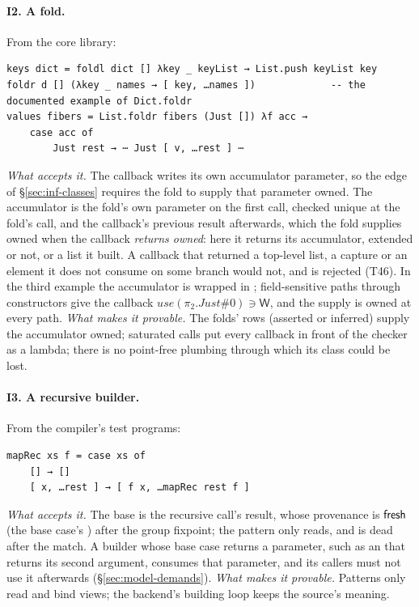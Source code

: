 \paragraph{I2. A fold.} From the core library:
\begin{Verbatim}
keys dict = foldl dict [] λkey _ keyList → List.push keyList key
foldr d [] (λkey _ names → [ key, …names ])             -- the documented example of Dict.foldr
values fibers = List.foldr fibers (Just []) λf acc →
    case acc of
        Just rest → ⋯ Just [ v, …rest ] ⋯
\end{Verbatim}
\emph{What accepts it.} The callback writes its own accumulator parameter, so the edge of
\S\ref{sec:inf-classes} requires the fold to supply that parameter owned. The accumulator is the fold's
own parameter on the first call, checked unique at the fold's call, and the callback's previous result
afterwards, which the fold supplies owned when the callback \emph{returns owned}: here it returns its
accumulator, extended or not, or a list it built. A callback that returned a top-level list, a capture or
an element it does not consume on some branch would not, and is rejected (T46). In the third example the accumulator is wrapped in
; field-sensitive paths through constructors give the callback $\mathit{use}(\pi_2.\mathit{Just}\#0) \ni \mathsf{W}$,
and the supply is owned at every path. \emph{What makes it provable.} The folds' rows (asserted or
inferred) supply the accumulator owned; saturated calls put every callback in front of the checker as a
lambda; there is no point-free plumbing through which its class could be lost.

\paragraph{I3. A recursive builder.} From the compiler's test programs:
\begin{Verbatim}
mapRec xs f = case xs of
    [] → []
    [ x, …rest ] → [ f x, …mapRec rest f ]
\end{Verbatim}
\emph{What accepts it.} The base is the recursive call's result, whose provenance is $\mathsf{fresh}$ (the base
case's \code{[]}) after the group fixpoint; the pattern only reads, and  is dead after the match.
A builder whose base case returns a parameter, such as an  that returns its second
argument, consumes that parameter, and its callers must not use it afterwards (\S\ref{sec:model-demands}).
\emph{What makes it provable.} Patterns only read and bind views; the backend's building loop keeps the
source's meaning.

